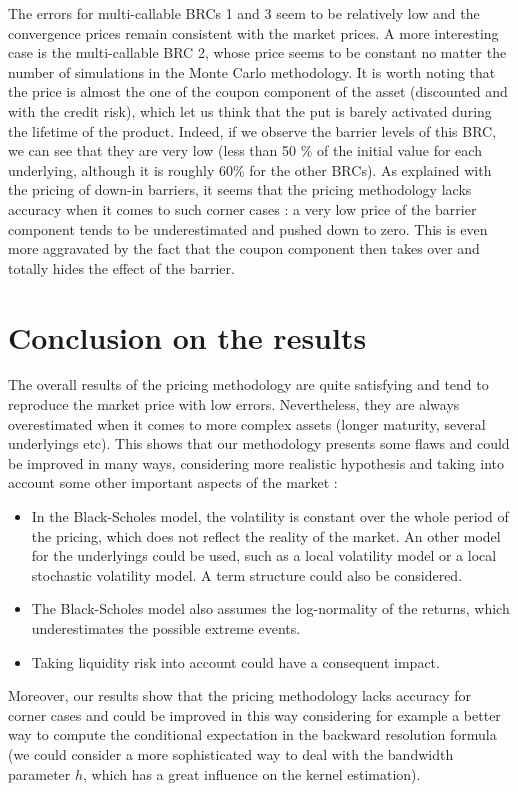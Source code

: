 \documentclass[a4paper,11pt,english]{book}
\begin{document}
The errors for multi-callable BRCs 1 and 3 seem to be relatively low and the convergence prices remain consistent with the market prices. A more interesting case is the multi-callable BRC 2, whose price seems to be constant no matter the number of simulations in the Monte Carlo methodology. It is worth noting that the price is almost the one of the coupon component of the asset (discounted and with the credit risk), which let us think that the put is barely activated during the lifetime of the product. Indeed, if we observe the barrier levels of this BRC, we can see that they are very low (less than 50 \% of the initial value for each underlying, although it is roughly 60\% for the other BRCs). As explained with the pricing of down-in barriers, it seems that the pricing methodology lacks accuracy when it comes to such corner cases : a very low price of the barrier component tends to be underestimated and pushed down to zero. This is even more aggravated by the fact that the coupon component then takes over and totally hides the effect of the barrier.

\section{Conclusion on the results}
The overall results of the pricing methodology are quite satisfying and tend to reproduce the market price with low errors. Nevertheless, they are always overestimated when it comes to more complex assets (longer maturity, several underlyings etc). This shows that our methodology presents some flaws and could be improved in many ways, considering more realistic hypothesis and taking into account some other important aspects of the market :
\begin{itemize}
    \item In the Black-Scholes model, the volatility is constant over the whole period of the pricing, which does not reflect the reality of the market. An other model for the underlyings could be used, such as a local volatility model or a local stochastic volatility model. A term structure could also be considered.
    \item The Black-Scholes model also assumes the log-normality of the returns, which underestimates the possible extreme events.
    \item Taking liquidity risk into account could have a consequent impact.
\end{itemize}

Moreover, our results show that the pricing methodology lacks accuracy for corner cases and could be improved in this way considering for example a better way to compute the conditional expectation in the backward resolution formula (we could consider a more sophisticated way to deal with the bandwidth parameter $h$, which has a great influence on the kernel estimation).
\end{document}
